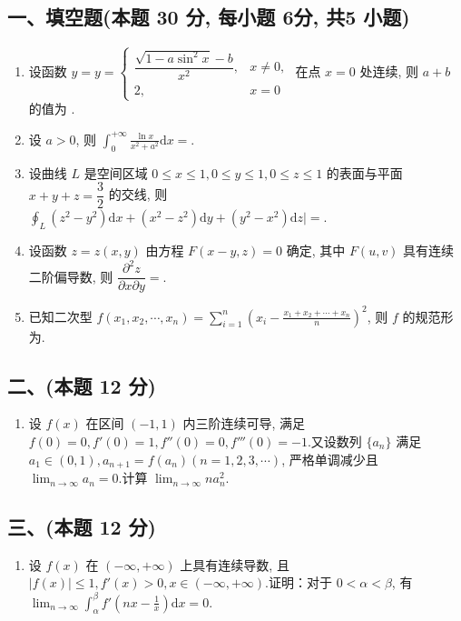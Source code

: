 \subsection*{一、填空题(本题 30 分,  每小题 6分,  共5 小题)}
\begin{enumerate}
    \item 设函数 $y = y = \begin{cases}
                  \dfrac{\sqrt{1 - a \sin^2 x} - b}{x^2}, & x \neq 0, \\
                  2,                                      & x = 0
              \end{cases} $ 在点 $x = 0$ 处连续, 则 $a + b$ 的值为 \underline{\quad \quad}.
    \item 设 $a > 0$, 则 $\displaystyle\int_{0}^{+\infty} \frac{\ln x}{x^2 + a^2} \mathrm{d}x =$\underline{\quad \quad}.
    \item 设曲线 $L$ 是空间区域 $0 \leqslant x \leqslant 1, 0 \leqslant y \leqslant 1, 0 \leqslant z \leqslant 1$ 的表面与平面 $x + y + z = \dfrac{3}{2}$ 的交线, 则 $\displaystyle\oint_L (z^2 - y^2) \mathrm{d}x + (x^2 - z^2) \mathrm{d}y + (y^2 - x^2) \mathrm{d}z \bigg| =$\underline{\quad \quad}.
    \item 设函数 $z = z(x, y)$ 由方程 $F(x - y, z) = 0$ 确定, 其中 $F(u, v)$ 具有连续二阶偏导数, 则 $\dfrac{\partial^2 z}{\partial x \partial y} =$\underline{\quad \quad}.
    \item 已知二次型 $f(x_1, x_2, \cdots, x_n) = \displaystyle\sum_{i=1}^{n} \left( x_i - \frac{x_1 + x_2 + \cdots + x_n}{n} \right)^2$, 则 $f$ 的规范形为\underline{\quad \quad}.
\end{enumerate}

\subsection*{二、(本题 12 分)}
\begin{enumerate}[start=6]
    \item 设 $f(x)$ 在区间 $(-1, 1)$ 内三阶连续可导, 满足 $f(0) = 0, f'(0) = 1, f''(0) = 0, f'''(0) = -1$.又设数列 $\{a_n\}$ 满足 $a_1 \in (0, 1), a_{n+1} = f(a_n) (n = 1, 2, 3, \cdots)$, 严格单调减少且 $\displaystyle\lim_{n \to \infty} a_n = 0$.计算 $\displaystyle\lim_{n \to \infty} n a_n^2$.
\end{enumerate}

\subsection*{三、(本题 12 分)}
\begin{enumerate}[start=7]
    \item 设 $f(x)$ 在 $(-\infty, +\infty)$ 上具有连续导数, 且 $|f(x)| \leqslant 1, f'(x) > 0, x \in (-\infty, +\infty)$.证明：对于 $0 < \alpha < \beta$, 有 $\displaystyle\lim_{n \to \infty} \int_{\alpha}^{\beta} f'(nx - \frac{1}{x}) \mathrm{d}x = 0$.
\end{enumerate}

